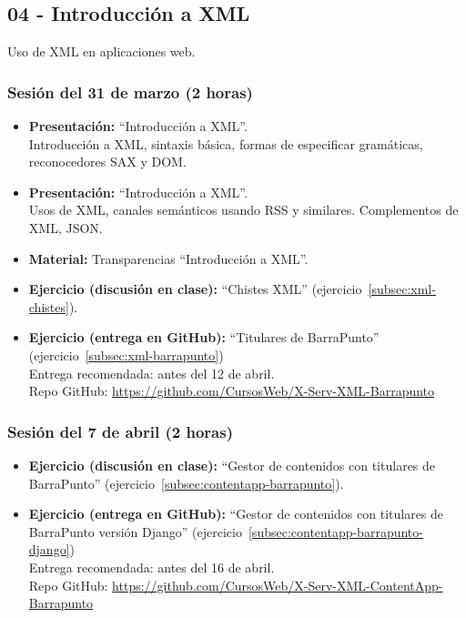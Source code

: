 \documentclass[a4paper,12pt]{article}
\begin{document}
\subsection{04 - Introducción a XML}

Uso de XML en aplicaciones web.

\subsubsection{Sesión del 31 de marzo (2 horas)}

\begin{itemize}
\item \textbf{Presentación:} ``Introducción a XML''. \\
 Introducción a XML, sintaxis básica, formas de especificar gramáticas, reconocedores SAX y DOM.
\item \textbf{Presentación:} ``Introducción a XML''. \\
Usos de XML, canales semánticos usando RSS y similares. Complementos de XML, JSON.
\item \textbf{Material:} Transparencias ``Introducción a XML''.
\item \textbf{Ejercicio (discusión en clase):} ``Chistes XML'' (ejercicio~\ref{subsec:xml-chistes}).
\item \textbf{Ejercicio (entrega en GitHub):} ``Titulares de BarraPunto'' (ejercicio~\ref{subsec:xml-barrapunto}) \\
  Entrega recomendada: antes del 12 de abril. \\
  Repo GitHub: \url{https://github.com/CursosWeb/X-Serv-XML-Barrapunto}
\end{itemize}

\subsubsection{Sesión del 7 de abril (2 horas)}

\begin{itemize}
\item \textbf{Ejercicio (discusión en clase):} ``Gestor de contenidos con titulares de BarraPunto'' (ejercicio~\ref{subsec:contentapp-barrapunto}). 
\item \textbf{Ejercicio (entrega en GitHub):} ``Gestor de contenidos con titulares de BarraPunto versión Django'' (ejercicio~\ref{subsec:contentapp-barrapunto-django}) \\
  Entrega recomendada: antes del 16 de abril. \\
  Repo GitHub: \url{https://github.com/CursosWeb/X-Serv-XML-ContentApp-Barrapunto}
\end{itemize}
\end{document}
